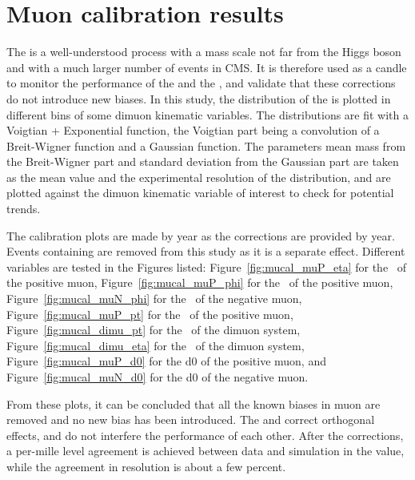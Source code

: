 \section{Muon calibration results} \label{sec:muon_cal}

The \zmm is a well-understood process with a mass scale not far from the Higgs boson and with a much larger number of events in CMS.
It is therefore used as a candle to monitor the performance of the \RochCorr and the \GeoFit, 
and validate that these corrections do not introduce new biases.
In this study, the distribution of the \mmm is plotted in different bins of some dimuon kinematic variables.
The \mmm distributions are fit with a Voigtian + Exponential function, 
the Voigtian part being a convolution of a Breit-Wigner function and a Gaussian function.
The parameters mean mass from the Breit-Wigner part and standard deviation from the Gaussian part are 
taken as the mean value and the experimental resolution of the \mmm distribution,
and are plotted against the dimuon kinematic variable of interest to check for potential trends.

The calibration plots are made by year as the corrections are provided by year.
Events containing \FSR are removed from this study as it is a separate effect.
Different variables are tested in the Figures listed: 
Figure~\ref{fig:mucal_muP_eta} for the \eta ~of the positive muon,
Figure~\ref{fig:mucal_muP_phi} for the \phi ~of the positive muon,
Figure~\ref{fig:mucal_muN_phi} for the \phi ~of the negative muon,
Figure~\ref{fig:mucal_muP_pt} for the \pt ~of the positive muon,
Figure~\ref{fig:mucal_dimu_pt} for the \pt ~of the dimuon system,
Figure~\ref{fig:mucal_dimu_eta} for the \eta ~of the dimuon system,
Figure~\ref{fig:mucal_muP_d0} for the d0 of the positive muon,
and Figure~\ref{fig:mucal_muN_d0} for the d0 of the negative muon.

From these plots, it can be concluded that all the known biases in muon \pt are removed and no new bias has been introduced.
The \RochCorr and \GeoFit correct orthogonal effects, and do not interfere the performance of each other.
After the corrections, a per-mille level agreement is achieved between data and simulation in the \mmm value,
while the agreement in \mmm resolution is about a few percent. 

